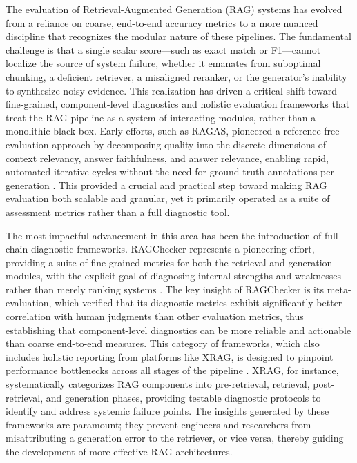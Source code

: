 \documentclass[11pt,a4paper]{article}
\begin{document}
The evaluation of Retrieval-Augmented Generation (RAG) systems has evolved from a reliance on coarse, end-to-end accuracy metrics to a more nuanced discipline that recognizes the modular nature of these pipelines. The fundamental challenge is that a single scalar score---such as exact match or F1---cannot localize the source of system failure, whether it emanates from suboptimal chunking, a deficient retriever, a misaligned reranker, or the generator's inability to synthesize noisy evidence. This realization has driven a critical shift toward fine-grained, component-level diagnostics and holistic evaluation frameworks that treat the RAG pipeline as a system of interacting modules, rather than a monolithic black box. Early efforts, such as RAGAS, pioneered a reference-free evaluation approach by decomposing quality into the discrete dimensions of context relevancy, answer faithfulness, and answer relevance, enabling rapid, automated iterative cycles without the need for ground-truth annotations per generation \cite{arxiv:2309.15217v1}. This provided a crucial and practical step toward making RAG evaluation both scalable and granular, yet it primarily operated as a suite of assessment metrics rather than a full diagnostic tool.

The most impactful advancement in this area has been the introduction of full-chain diagnostic frameworks. RAGChecker represents a pioneering effort, providing a suite of fine-grained metrics for both the retrieval and generation modules, with the explicit goal of diagnosing internal strengths and weaknesses rather than merely ranking systems \cite{arxiv:2408.08067v2}. The key insight of RAGChecker is its meta-evaluation, which verified that its diagnostic metrics exhibit significantly better correlation with human judgments than other evaluation metrics, thus establishing that component-level diagnostics can be more reliable and actionable than coarse end-to-end measures. This category of frameworks, which also includes holistic reporting from platforms like XRAG, is designed to pinpoint performance bottlenecks across all stages of the pipeline \cite{arxiv:2412.15529v4}. XRAG, for instance, systematically categorizes RAG components into pre-retrieval, retrieval, post-retrieval, and generation phases, providing testable diagnostic protocols to identify and address systemic failure points. The insights generated by these frameworks are paramount; they prevent engineers and researchers from misattributing a generation error to the retriever, or vice versa, thereby guiding the development of more effective RAG architectures.
\end{document}
